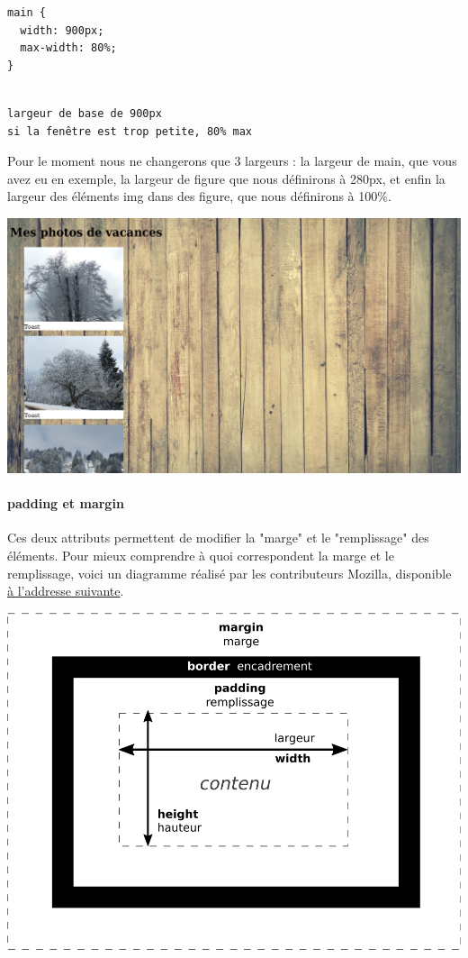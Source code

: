 \begin{minipage}{0.35\textwidth}
\begin{verbatim}
main {
  width: 900px;
  max-width: 80%;
}
\end{verbatim}
\end{minipage}
\begin{minipage}{0.65\textwidth}
\begin{verbatim}

largeur de base de 900px
si la fenêtre est trop petite, 80% max

\end{verbatim}
\end{minipage}

Pour le moment nous ne changerons que 3 largeurs : la largeur de main, que vous
avez eu en exemple, la largeur de figure que nous définirons à 280px, et enfin
la largeur des éléments img dans des figure, que nous définirons à 100\%.
\begin{center}\includegraphics[width=.8\linewidth]{img/screenshot_width.png}\end{center}

\paragraph{padding et margin}
Ces deux attributs permettent de modifier la "marge" et le "remplissage" des
éléments. Pour mieux comprendre à quoi correspondent la marge et le remplissage,
voici un diagramme réalisé par les contributeurs Mozilla, disponible
\href{https://developer.mozilla.org/fr/docs/Apprendre/CSS/Introduction_%C3%A0_CSS/Le_mod%C3%A8le_de_bo%C3%AEte}{à l'addresse suivante}.
\begin{center}\includegraphics[width=.8\linewidth]{img/box_model.png}\end{center}

